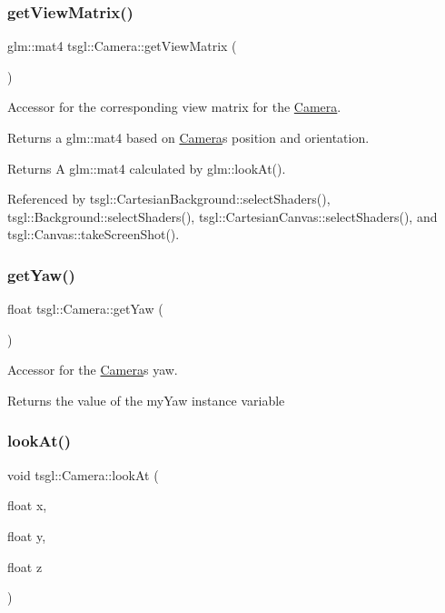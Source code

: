\subsubsection{\texorpdfstring{get\+View\+Matrix()}{getViewMatrix()}}
{\footnotesize\ttfamily glm\+::mat4 tsgl\+::\+Camera\+::get\+View\+Matrix (\begin{DoxyParamCaption}{ }\end{DoxyParamCaption})}



Accessor for the corresponding view matrix for the \hyperlink{classtsgl_1_1_camera}{Camera}. 

Returns a glm\+::mat4 based on \hyperlink{classtsgl_1_1_camera}{Camera}\textquotesingle{}s position and orientation. \begin{DoxyReturn}{Returns}
A glm\+::mat4 calculated by glm\+::look\+At(). 
\end{DoxyReturn}


Referenced by tsgl\+::\+Cartesian\+Background\+::select\+Shaders(), tsgl\+::\+Background\+::select\+Shaders(), tsgl\+::\+Cartesian\+Canvas\+::select\+Shaders(), and tsgl\+::\+Canvas\+::take\+Screen\+Shot().

\mbox{\label{classtsgl_1_1_camera_ae66ea7ccf619657cf817e70c934a3d36}} 
\subsubsection{\texorpdfstring{get\+Yaw()}{getYaw()}}
{\footnotesize\ttfamily float tsgl\+::\+Camera\+::get\+Yaw (\begin{DoxyParamCaption}{ }\end{DoxyParamCaption})}



Accessor for the \hyperlink{classtsgl_1_1_camera}{Camera}\textquotesingle{}s yaw. 

Returns the value of the my\+Yaw instance variable \mbox{\label{classtsgl_1_1_camera_a3228e5545b7f20bc39282ea9267acfda}} 
\subsubsection{\texorpdfstring{look\+At()}{lookAt()}}
{\footnotesize\ttfamily void tsgl\+::\+Camera\+::look\+At (\begin{DoxyParamCaption}\item[{float}]{x,  }\item[{float}]{y,  }\item[{float}]{z }\end{DoxyParamCaption})}



